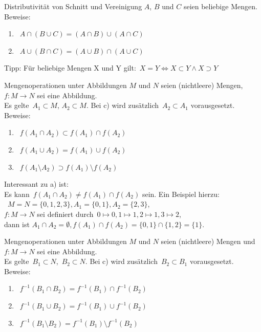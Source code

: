 \documentclass{uebblatt}
\begin{document}

\begin{aufgabe}{Distributivität von Schnitt und Vereinigung}
$A$, $B$ und $C$ seien beliebige Mengen. Beweise:
\begin{enumerate}
\item ~$A \cap (B \cup C) = (A \cap B) \cup (A \cap C)$
\item ~$A \cup (B \cap C) = (A \cup B) \cap (A \cup C)$
\end{enumerate}
Tipp: Für beliebige Mengen X und Y gilt:~$X = Y \Leftrightarrow X \subset Y \wedge X \supset Y$\\
\end{aufgabe}

\begin{aufgabe}{Mengenoperationen unter Abbildungen}
$M$ und $N$ seien (nichtleere) Mengen,~$f:M \to N$ sei eine Abbildung.\\
Es gelte~$A_1 \subset M$, $A_2 \subset M$. Bei c) wird zusätzlich~$A_2 \subset A_1$ vorausgesetzt. Beweise:
\begin{enumerate}
\item ~$f(A_1 \cap A_2) \subset f(A_1) \cap f(A_2)$
\item ~$f(A_1 \cup A_2) = f(A_1) \cup f(A_2)$
\item ~$f(A_1 \setminus A_2) \supset f(A_1) \setminus f(A_2)$
\end{enumerate}
Interessant zu a) ist:\\
Es kann~$f(A_1 \cap A_2) \neq f(A_1) \cap f(A_2)$ sein. Ein Beispiel hierzu:\\~$M = N = \{0, 1, 2, 3\}, A_1 = \{0, 1\}, A_2 = \{2, 3\}$,\\
$ f:M \to N$ sei definiert durch~$0 \mapsto 0, 1 \mapsto 1, 2 \mapsto 1, 3 \mapsto 2$,\\
dann ist $A_1 \cap A_2 = \emptyset, f(A_1) \cap f(A_2) = \{0, 1\} \cap \{1, 2\} = \{1\}$.\\
\end{aufgabe}

\begin{aufgabe}{Mengenoperationen unter Abbildungen}
$M$ und $N$ seien (nichtleere) Mengen und~$f:M \to N$ sei eine Abbildung.\\
Es gelte~$B_1 \subset N$,~$B_2 \subset N$. Bei c) wird zusätzlich~$B_2 \subset B_1$ vorausgesetzt. Beweise:
\begin{enumerate}
\item ~$f^{-1}(B_1 \cap B_2) = f^{-1}(B_1) \cap f^{-1}(B_2)$
\item ~$f^{-1}(B_1 \cup B_2) = f^{-1}(B_1) \cup f^{-1}(B_2)$
\item~$f^{-1}(B_1 \setminus B_2) = f^{-1}(B_1) \setminus f^{-1}(B_2)$
\end{enumerate}
\end{aufgabe}
\end{document}
